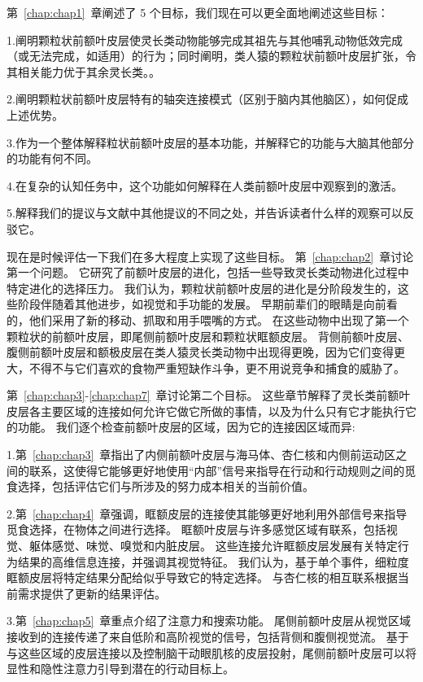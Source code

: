 第~\ref{chap:chap1}~章阐述了 5 个目标，我们现在可以更全面地阐述这些目标：
\par
1.阐明颗粒状前额叶皮层使灵长类动物能够完成其祖先与其他哺乳动物低效完成（或无法完成，如适用）的行为；同时阐明，类人猿的颗粒状前额叶皮层扩张，令其相关能力优于其余灵长类。。
\par
2.阐明颗粒状前额叶皮层特有的轴突连接模式（区别于脑内其他脑区），如何促成上述优势。
\par
3.作为一个整体解释粒状前额叶皮层的基本功能，并解释它的功能与大脑其他部分的功能有何不同。
\par 
4.在复杂的认知任务中，这个功能如何解释在人类前额叶皮层中观察到的激活。
\par 
5.解释我们的提议与文献中其他提议的不同之处，并告诉读者什么样的观察可以反驳它。
\par 
现在是时候评估一下我们在多大程度上实现了这些目标。
第~\ref{chap:chap2}~章讨论第一个问题。
它研究了前额叶皮层的进化，包括一些导致灵长类动物进化过程中特定进化的选择压力。
我们认为，颗粒状前额叶皮层的进化是分阶段发生的，这些阶段伴随着其他进步，如视觉和手功能的发展。
早期前辈们的眼睛是向前看的，他们采用了新的移动、抓取和用手喂嘴的方式。
在这些动物中出现了第一个颗粒状的前额叶皮层，即尾侧前额叶皮层和颗粒状眶额皮层。
背侧前额叶皮层、腹侧前额叶皮层和额极皮层在类人猿灵长类动物中出现得更晚，因为它们变得更大，不得不与它们喜欢的食物严重短缺作斗争，更不用说竞争和捕食的威胁了。
\par 
第~\ref{chap:chap3}-\ref{chap:chap7}~章讨论第二个目标。
这些章节解释了灵长类前额叶皮层各主要区域的连接如何允许它做它所做的事情，以及为什么只有它才能执行它的功能。
我们逐个检查前额叶皮层的区域，因为它的连接因区域而异:
\par 
1.第~\ref{chap:chap3}~章指出了内侧前额叶皮层与海马体、杏仁核和内侧前运动区之间的联系，这使得它能够更好地使用“内部”信号来指导在行动和行动规则之间的觅食选择，包括评估它们与所涉及的努力成本相关的当前价值。
\par 
2.第~\ref{chap:chap4}~章强调，眶额皮层的连接使其能够更好地利用外部信号来指导觅食选择，在物体之间进行选择。
眶额叶皮层与许多感觉区域有联系，包括视觉、躯体感觉、味觉、嗅觉和内脏皮层。
这些连接允许眶额皮层发展有关特定行为结果的高维信息连接，并强调其视觉特征。
我们认为，基于单个事件，细粒度眶额皮层将特定结果分配给似乎导致它的特定选择。
与杏仁核的相互联系根据当前需求提供了更新的结果评估。
\par 
3.第~\ref{chap:chap5}~章重点介绍了注意力和搜索功能。
尾侧前额叶皮层从视觉区域接收到的连接传递了来自低阶和高阶视觉的信号，包括背侧和腹侧视觉流。
基于与这些区域的皮层连接以及控制脑干动眼肌核的皮层投射，尾侧前额叶皮层可以将显性和隐性注意力引导到潜在的行动目标上。

